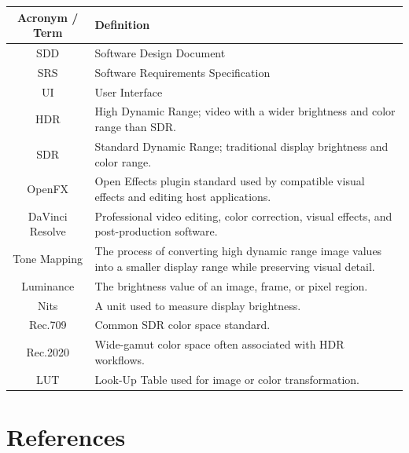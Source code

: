 \documentclass[12pt,hyphens]{article}
\begin{document}
\begin{table}[H]
\centering
\renewcommand{\arraystretch}{1.4}
\begin{tabular}{|c|p{10cm}|}
\hline
\textbf{Acronym / Term} & \textbf{Definition} \\
\hline
SDD & Software Design Document \\
\hline
SRS & Software Requirements Specification \\
\hline
UI & User Interface \\
\hline
HDR & High Dynamic Range; video with a wider brightness and color range than SDR. \\
\hline
SDR & Standard Dynamic Range; traditional display brightness and color range. \\
\hline
OpenFX & Open Effects plugin standard used by compatible visual effects and editing host applications. \\
\hline
DaVinci Resolve & Professional video editing, color correction, visual effects, and post-production software. \\
\hline
Tone Mapping & The process of converting high dynamic range image values into a smaller display range while preserving visual detail. \\
\hline
Luminance & The brightness value of an image, frame, or pixel region. \\
\hline
Nits & A unit used to measure display brightness. \\
\hline
Rec.709 & Common SDR color space standard. \\
\hline
Rec.2020 & Wide-gamut color space often associated with HDR workflows. \\
\hline
LUT & Look-Up Table used for image or color transformation. \\
\hline
\end{tabular}
\end{table}


\section*{References}
\end{document}
